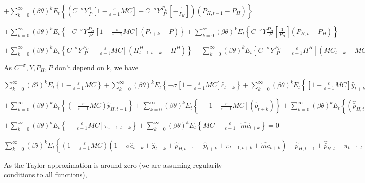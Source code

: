 \documentclass[
]{article}
\begin{document}
\(\displaystyle + \sum_{k=0}^\infty (\beta \theta)^kE_t \left\{ \left( C^{-\sigma} Y \frac{1}{P} \left[ 1-\frac{\varepsilon}{\varepsilon-1} MC \right] + C^{-\sigma}Y \frac{P_H}{P} \left[ -\frac{1}{P_H} \right] \right)(P_{H,t-1}-P_H) \right\}\)

\(\displaystyle + \sum_{k=0}^\infty (\beta \theta)^kE_t \left\{ -C^{-\sigma} Y \frac{P_{H}}{P^2} \left[ 1-\frac{\varepsilon}{\varepsilon-1} MC \right](P_{t+k}-P) \right\} + \sum_{k=0}^\infty (\beta \theta)^kE_t \left\{ C^{-\sigma} Y \frac{P_{H}}{P} \left[ \frac{1}{P_H} \right](\bar{P}_{H,t}-P_H) \right\}\)

\(\displaystyle + \sum_{k=0}^\infty (\beta \theta)^kE_t \left\{ C^{-\sigma} Y \frac{P_{H}}{P} \left[ -\frac{\varepsilon}{\varepsilon-1} MC \right](\Pi_{t-1,t+k}^H-\Pi^H) \right\} + \sum_{k=0}^\infty (\beta \theta)^kE_t \left\{ C^{-\sigma} Y \frac{P_{H}}{P} \left[ -\frac{\varepsilon}{\varepsilon-1} \Pi^H \right](MC_{t+k}-MC) \right\}=0\)

As \(C^{-\sigma}, Y, P_H, P\) don't depend on k, we have

\(\displaystyle \sum_{k=0}^\infty (\beta \theta)^kE_t \left\{ 1-\frac{\varepsilon}{\varepsilon-1} MC \right\} + \sum_{k=0}^\infty (\beta \theta)^kE_t \left\{ -\sigma \left[ 1-\frac{\varepsilon}{\varepsilon-1} MC \right]\hat{c}_{t+k} \right\} + \sum_{k=0}^\infty (\beta \theta)^kE_t \left\{ \left[ 1-\frac{\varepsilon}{\varepsilon-1} MC \right]\hat{y}_{t+k} \right\}\)

\(\displaystyle + \sum_{k=0}^\infty (\beta \theta)^kE_t \left\{ \left(-\frac{\varepsilon}{\varepsilon-1} MC \right)\hat{p}_{H,t-1} \right\} + \sum_{k=0}^\infty (\beta \theta)^kE_t \left\{ - \left[ 1-\frac{\varepsilon}{\varepsilon-1} MC \right](\hat{p}_{t+k}) \right\} + \sum_{k=0}^\infty (\beta \theta)^kE_t \left\{ (\hat{\bar{p}}_{H,t}) \right\}\)

\(\displaystyle + \sum_{k=0}^\infty (\beta \theta)^kE_t \left\{ \left[ -\frac{\varepsilon}{\varepsilon-1} MC \right]\pi_{t-1,t+k} \right\} + \sum_{k=0}^\infty (\beta \theta)^kE_t \left\{ MC \left[ -\frac{\varepsilon}{\varepsilon-1} \right]\widehat{mc}_{t+k} \right\}=0\)

\(\displaystyle \sum_{k=0}^\infty (\beta \theta)^kE_t \left\{ \left(1-\frac{\varepsilon}{\varepsilon-1} MC \right)(1-\sigma \hat{c}_{t+k} + \hat{y}_{t+k} + \hat{p}_{H,t-1} -\hat{p}_{t+k} + \pi_{t-1,t+k} + \widehat{mc}_{t+k}) -\hat{p}_{H,t-1} +\hat{\bar{p}}_{H,t}-\pi_{t-1,t+k} - \widehat{mc}_{t+k} \right\}\)

As the Taylor approximation is around zero (we are assuming regularity
conditions to all functions),
\end{document}
